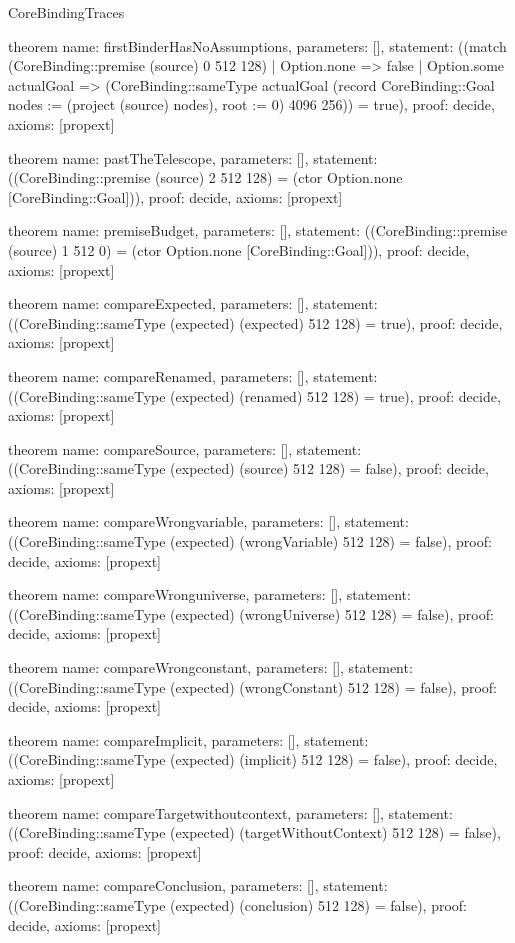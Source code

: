 \begin{lexlean}{CoreBindingTraces}
\begin{semanticmodule}
theorem{
 name: firstBinderHasNoAssumptions,
 parameters: [],
 statement: ((match (CoreBinding::premise (source) 0 512 128) | Option.none => false | Option.some actualGoal => (CoreBinding::sameType actualGoal (record CoreBinding::Goal {nodes := (project (source) nodes), root := 0}) 4096 256)) = true),
 proof: decide{},
 axioms: [propext]
}

theorem{
 name: pastTheTelescope,
 parameters: [],
 statement: ((CoreBinding::premise (source) 2 512 128) = (ctor Option.none [CoreBinding::Goal])),
 proof: decide{},
 axioms: [propext]
}

theorem{
 name: premiseBudget,
 parameters: [],
 statement: ((CoreBinding::premise (source) 1 512 0) = (ctor Option.none [CoreBinding::Goal])),
 proof: decide{},
 axioms: [propext]
}

theorem{
 name: compareExpected,
 parameters: [],
 statement: ((CoreBinding::sameType (expected) (expected) 512 128) = true),
 proof: decide{},
 axioms: [propext]
}

theorem{
 name: compareRenamed,
 parameters: [],
 statement: ((CoreBinding::sameType (expected) (renamed) 512 128) = true),
 proof: decide{},
 axioms: [propext]
}

theorem{
 name: compareSource,
 parameters: [],
 statement: ((CoreBinding::sameType (expected) (source) 512 128) = false),
 proof: decide{},
 axioms: [propext]
}

theorem{
 name: compareWrongvariable,
 parameters: [],
 statement: ((CoreBinding::sameType (expected) (wrongVariable) 512 128) = false),
 proof: decide{},
 axioms: [propext]
}

theorem{
 name: compareWronguniverse,
 parameters: [],
 statement: ((CoreBinding::sameType (expected) (wrongUniverse) 512 128) = false),
 proof: decide{},
 axioms: [propext]
}

theorem{
 name: compareWrongconstant,
 parameters: [],
 statement: ((CoreBinding::sameType (expected) (wrongConstant) 512 128) = false),
 proof: decide{},
 axioms: [propext]
}

theorem{
 name: compareImplicit,
 parameters: [],
 statement: ((CoreBinding::sameType (expected) (implicit) 512 128) = false),
 proof: decide{},
 axioms: [propext]
}

theorem{
 name: compareTargetwithoutcontext,
 parameters: [],
 statement: ((CoreBinding::sameType (expected) (targetWithoutContext) 512 128) = false),
 proof: decide{},
 axioms: [propext]
}

theorem{
 name: compareConclusion,
 parameters: [],
 statement: ((CoreBinding::sameType (expected) (conclusion) 512 128) = false),
 proof: decide{},
 axioms: [propext]
}


\end{semanticmodule}
\end{lexlean}
